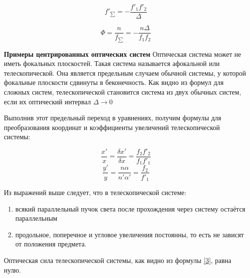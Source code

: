     \begin{equation}\label{2}
        f'_{\sum } = - \frac{f'_1 f'_2}{\Delta}
    \end{equation}

    \begin{equation}\label{3}
        \Phi = \frac{n}{f_{\sum}} = -\frac{n\Delta}{f_1 f_2}
    \end{equation}



    \textbf{Примеры центрированных оптических систем}
    Оптическая система может не иметь фокальных плоскостей. Такая система называется афокальной или телескопической.
    Она является предельным случаем обычной системы, у которой фокальные плоскости сдвинуты в беконечность.
    Как видно из формул для сложных систем, телескопической становится система из двух обычных систем, если их оптический интервал $\Delta \rightarrow 0$

    Выполнив этот предельный переход в уравнениях, получим формулы для преобразования координат и коэффициенты увеличений телескопической системы:

    \[ \frac{x'}{x} = \frac{\delta x'}{\delta x} = \frac{f_2 f'_2}{f_1 f'_1} \]
    \[ \frac{y'}{y} = \frac{n \alpha}{n' \alpha'} = \frac{f_2}{f'_1} \]
    

    Из выражений выше следует, что в телескопической системе:
    \begin{enumerate}
        \item всякий параллельный пучок света после прохождения через систему остаётся параллельным
        \item продольное, поперечное и угловое увеличения постоянны, то есть не зависят от положения предмета.
    \end{enumerate}

    Оптическая сила телескопической системы, как видно из формулы \ref{3}, равна нулю.
